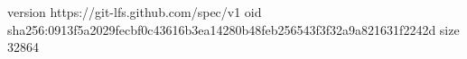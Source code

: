 version https://git-lfs.github.com/spec/v1
oid sha256:0913f5a2029fecbf0c43616b3ea14280b48feb256543f3f32a9a821631f2242d
size 32864

